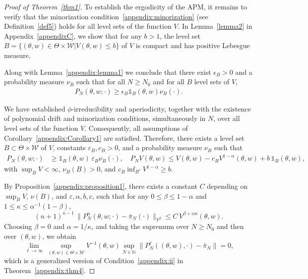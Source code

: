 \documentclass[pdflatex,sn-mathphys-num]{sn-jnl}
\newcommand{\ind}{\mathds{1}}
\renewcommand{\geq}{\geqslant}
\renewcommand{\leq}{\leqslant}
\theoremstyle{thmstyleone}
\theoremstyle{thmstyletwo}
\theoremstyle{thmstylethree}
\begin{document}
\begin{proof}[Proof of Theorem~{\upshape\ref{thm1}}]
To establish the ergodicity of the APM, it remains to verify that the minorization condition~\eqref{appendix:minorization} (see Definition~\ref{def5}) holds for all level sets of the function $V$. In Lemma~\ref{lemma2} in Appendix~\ref{appendixC}, we show that for any $b>1$, the level set 
\(B = \{(\theta, w) \in \Theta \times \mathcal{W} | V(\theta, w) \leq b\} \) of $V$
is compact and has positive Lebesgue measure.

Along with Lemma~\ref{appendix:lemma1} we conclude that there exist $\epsilon_B > 0$ and a probability measure $\nu_B$ such that for all $N \geq N_0$ and for all $B$ level sets of $V$,
\begin{align}
P_N(\theta, w; \cdot) \geq \epsilon_B \ind_B(\theta, w) \nu_B(\cdot).
    \label{minorization}
\end{align}

We have established $\phi$-irreducibility and aperiodicity, together with the existence of polynomial drift and minorization conditions, simultaneously in $N$, over all level sets of the function $V$. Consequently, all assumptions of Corollary~\ref{appendix:Corollary1} are satisfied. Therefore, there exists a level set \( B \subset \Theta \times \mathcal{W} \) of $V$, constants \( \varepsilon_B, c_B > 0 \), and a probability measure \( \nu_B \) such that
\begin{align*}
P_N(\theta,w ;\cdot) &\geq \ind_B(\theta,w)\, \varepsilon_B \nu_B(\cdot), \quad
P_N V(\theta,w) \leq V(\theta,w) - c_B V^{1-\alpha}(\theta,w) + b\, \ind_B(\theta,w),
\end{align*}
with $\sup_B V < \infty$, $\nu_B(B) > 0$, and $c_B \inf_{B^c} V^{1-\alpha} \geq b$.

By Proposition~\ref{appendix:proposition1}, there exists a constant $C$ depending on $\sup_B V$, $\nu(B)$, and $\varepsilon, \alpha, b, c$, such that for any $0 \leq \beta \leq 1 - \alpha$ and $1 \leq \kappa \leq \alpha^{-1}(1 - \beta)$,
\begin{equation*}
(n+1)^{\kappa-1}\,\|P_N^n(\theta,w ; \cdot) - \bar\pi_N(\cdot)\|_{V^\beta} \leq C\,V^{\beta+\alpha\kappa}(\theta,w).
\end{equation*}
Choosing $\beta=0$ and $\alpha=1/\kappa$, and taking the supremum over $N \geq N_0$ and then over $(\theta,w)$, we obtain
\begin{equation}
\lim_{\ell \to \infty} \,
\sup_{(\theta,w) \in \Theta \times \mathcal{W}}
V^{-1}(\theta,w)
\sup_{N \in \mathbb{N}}
\| P^\ell_N((\theta,w), \cdot) - \bar\pi_N \|  = 0,
\label{a1ii}
\end{equation}
which is a generalized version of Condition~\eqref{appendix:ii} in Theorem~\ref{appendix:thm4}.


\end{proof}
\end{document}
